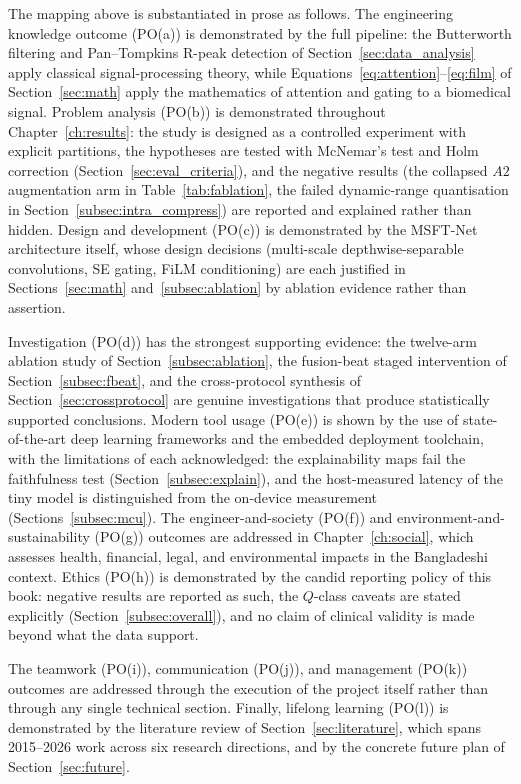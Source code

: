 The mapping above is substantiated in prose as follows. The engineering
knowledge outcome (PO(a)) is demonstrated by the full pipeline: the
Butterworth filtering and Pan--Tompkins R-peak detection of
Section~\ref{sec:data_analysis} apply classical signal-processing theory,
while Equations~\ref{eq:attention}--\ref{eq:film} of
Section~\ref{sec:math} apply the mathematics of attention and gating to a
biomedical signal. Problem analysis (PO(b)) is demonstrated throughout
Chapter~\ref{ch:results}: the study is designed as a controlled experiment
with explicit partitions, the hypotheses are tested with McNemar's test and
Holm correction (Section~\ref{sec:eval_criteria}), and the negative results
(the collapsed $A2$ augmentation arm in Table~\ref{tab:fablation}, the
failed dynamic-range quantisation in Section~\ref{subsec:intra_compress})
are reported and explained rather than hidden. Design and development
(PO(c)) is demonstrated by the MSFT-Net architecture itself, whose design
decisions (multi-scale depthwise-separable convolutions, SE gating, FiLM
conditioning) are each justified in Sections~\ref{sec:math}
and~\ref{subsec:ablation} by ablation evidence rather than assertion.

Investigation (PO(d)) has the strongest supporting evidence: the twelve-arm ablation
study of Section~\ref{subsec:ablation}, the fusion-beat staged
intervention of Section~\ref{subsec:fbeat}, and the cross-protocol
synthesis of Section~\ref{sec:crossprotocol} are genuine investigations
that produce statistically supported conclusions. Modern tool usage (PO(e))
is shown by the use of state-of-the-art deep learning frameworks and the
embedded deployment toolchain, with the limitations of each acknowledged:
the explainability maps fail the faithfulness test (Section~\ref{subsec:explain}),
and the host-measured latency of the tiny model is distinguished from the
on-device measurement (Sections~\ref{subsec:mcu}). The engineer-and-society
(PO(f)) and environment-and-sustainability (PO(g)) outcomes are addressed
in Chapter~\ref{ch:social}, which assesses health, financial, legal, and
environmental impacts in the Bangladeshi context. Ethics (PO(h)) is
demonstrated by the candid reporting policy of this book: negative results
are reported as such, the $Q$-class caveats are stated explicitly
(Section~\ref{subsec:overall}), and no claim of clinical validity is made
beyond what the data support.

The teamwork (PO(i)), communication (PO(j)), and management (PO(k))
outcomes are addressed through the execution of the project itself rather
than through any single technical section. Finally, lifelong learning
(PO(l)) is demonstrated by the literature review of Section~\ref{sec:literature},
which spans 2015--2026 work across six research directions, and by the
concrete future plan of Section~\ref{sec:future}.


